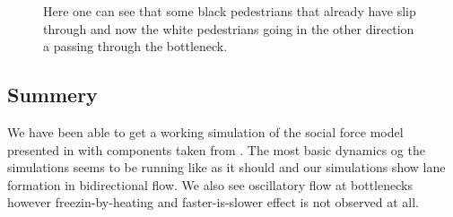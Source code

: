 \begin{figure}[h]
\centering
{}
\caption{Here one can see that some black pedestrians that already have slip through and now the white pedestrians going in the other direction a passing through the bottleneck.}
\label{fig:oscillitoryflow_litterature}
\end{figure}


\subsection{Summery}
We have been able to get a working simulation of the social force model 
presented in \cite{self-org} with components taken from \cite{ABconstant}. 
The most basic dynamics og the simulations seems to be running like as it 
should and our simulations show lane formation in bidirectional flow. We also  
see oscillatory flow at bottlenecks however freezin-by-heating 
and faster-is-slower effect is not observed at all.
